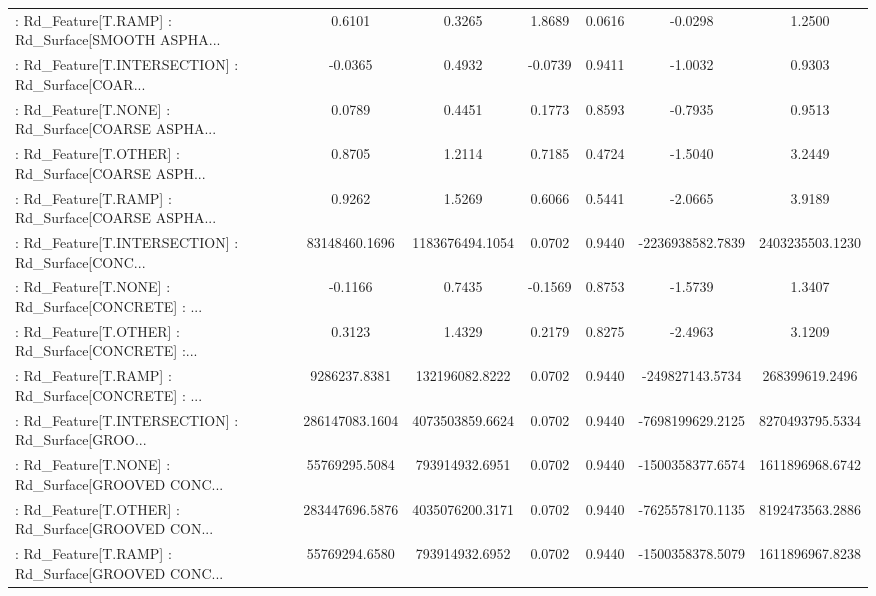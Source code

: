\begin{longtable}{p{4cm}cccccc}
 : Rd\_Feature[T.RAMP] : Rd\_Surface[SMOOTH ASPHA... &            0.6101 &            0.3265 &  1.8689 &       0.0616 &            -0.0298 &            1.2500 \\
 : Rd\_Feature[T.INTERSECTION] : Rd\_Surface[COAR... &           -0.0365 &            0.4932 & -0.0739 &       0.9411 &            -1.0032 &            0.9303 \\
 : Rd\_Feature[T.NONE] : Rd\_Surface[COARSE ASPHA... &            0.0789 &            0.4451 &  0.1773 &       0.8593 &            -0.7935 &            0.9513 \\
 : Rd\_Feature[T.OTHER] : Rd\_Surface[COARSE ASPH... &            0.8705 &            1.2114 &  0.7185 &       0.4724 &            -1.5040 &            3.2449 \\
 : Rd\_Feature[T.RAMP] : Rd\_Surface[COARSE ASPHA... &            0.9262 &            1.5269 &  0.6066 &       0.5441 &            -2.0665 &            3.9189 \\
 : Rd\_Feature[T.INTERSECTION] : Rd\_Surface[CONC... &     83148460.1696 &   1183676494.1054 &  0.0702 &       0.9440 &   -2236938582.7839 &   2403235503.1230 \\
 : Rd\_Feature[T.NONE] : Rd\_Surface[CONCRETE] : ... &           -0.1166 &            0.7435 & -0.1569 &       0.8753 &            -1.5739 &            1.3407 \\
 : Rd\_Feature[T.OTHER] : Rd\_Surface[CONCRETE] :... &            0.3123 &            1.4329 &  0.2179 &       0.8275 &            -2.4963 &            3.1209 \\
 : Rd\_Feature[T.RAMP] : Rd\_Surface[CONCRETE] : ... &      9286237.8381 &    132196082.8222 &  0.0702 &       0.9440 &    -249827143.5734 &    268399619.2496 \\
 : Rd\_Feature[T.INTERSECTION] : Rd\_Surface[GROO... &    286147083.1604 &   4073503859.6624 &  0.0702 &       0.9440 &   -7698199629.2125 &   8270493795.5334 \\
 : Rd\_Feature[T.NONE] : Rd\_Surface[GROOVED CONC... &     55769295.5084 &    793914932.6951 &  0.0702 &       0.9440 &   -1500358377.6574 &   1611896968.6742 \\
 : Rd\_Feature[T.OTHER] : Rd\_Surface[GROOVED CON... &    283447696.5876 &   4035076200.3171 &  0.0702 &       0.9440 &   -7625578170.1135 &   8192473563.2886 \\
 : Rd\_Feature[T.RAMP] : Rd\_Surface[GROOVED CONC... &     55769294.6580 &    793914932.6952 &  0.0702 &       0.9440 &   -1500358378.5079 &   1611896967.8238 \\

\end{longtable}
